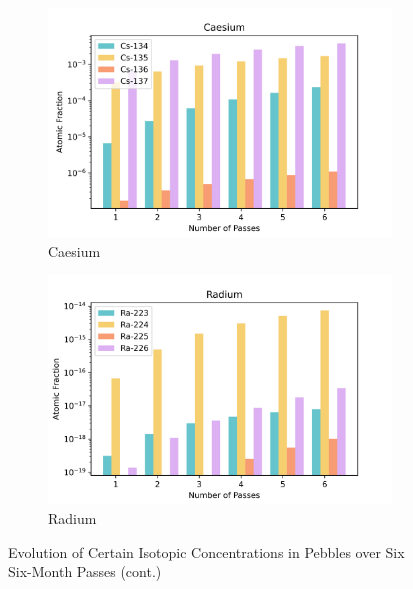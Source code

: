 \begin{figure}[H]\ContinuedFloat
\centering

\begin{subfigure}{0.95\textwidth}
  \includegraphics[width=0.95\linewidth]{figures/compositions/caesium}
  \caption{Caesium}
  \label{fig:cs}
\end{subfigure}%


\begin{subfigure}{0.95\textwidth}
  \includegraphics[width=0.95\linewidth]{figures/compositions/radium}
  \caption{Radium}
  \label{fig:ra}
\end{subfigure}%

\caption{Evolution of Certain Isotopic Concentrations in Pebbles over Six Six-Month Passes (cont.)}
\end{figure}

